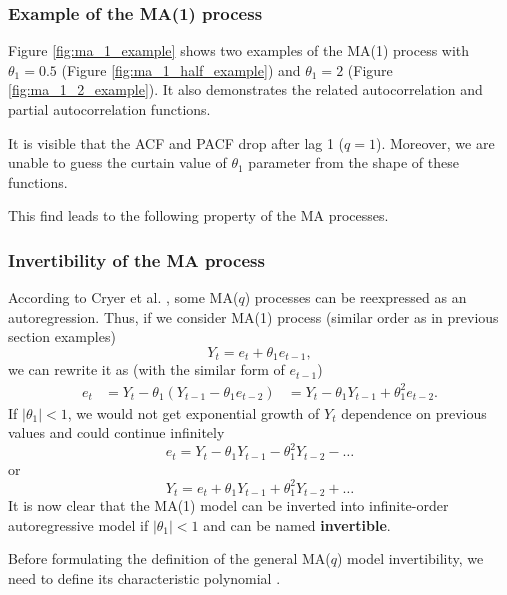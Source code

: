 \subsubsection{Example of the MA(1) process}

Figure \ref{fig:ma_1_example} shows two examples of the MA(1) process with $\theta_1 = 0.5$ (Figure \ref{fig:ma_1_half_example}) and $\theta_1 = 2$ (Figure \ref{fig:ma_1_2_example}). It also demonstrates the related autocorrelation and partial autocorrelation functions. 

It is visible that the ACF and PACF drop after lag 1 ($q = 1$). Moreover, we are unable to guess the curtain value of $\theta_1$ parameter from the shape of these functions.

This find leads to the following property of the MA processes.

\subsubsection{Invertibility of the MA process}

According to Cryer et al. \cite{cryer2008time}, some MA($q$) processes can be reexpressed as an autoregression. Thus, if we consider MA(1) process (similar order as in previous section examples)
\begin{equation}
    Y_t = e_t + \theta_{1}e_{t-1},
\end{equation}
we can rewrite it as (with the similar form of $e_{t-1}$)
\begin{equation}
\begin{aligned}
e_t &= Y_t - \theta_{1}(Y_{t-1} - \theta_{1}e_{t-2})
&= Y_t - \theta_{1}Y_{t-1} + \theta_{1}^{2}e_{t-2}.
\end{aligned}
\end{equation}
If $|\theta_1| < 1$, we would not get exponential growth of $Y_t$ dependence on previous values and could continue infinitely
\begin{equation}
    e_t = Y_t - \theta_{1}Y_{t-1} - \theta_{1}^{2}Y_{t-2} - \ldots
\end{equation}
or 
\begin{equation}
    Y_t = e_t + \theta_{1}Y_{t-1} + \theta_{1}^{2}Y_{t-2} + \ldots
\end{equation}
It is now clear that the MA(1) model can be inverted into infinite-order autoregressive model if $|\theta_1| < 1$ and can be named \textbf{invertible}.

Before formulating the definition of the general MA($q$) model invertibility, we need to define its characteristic polynomial \cite{cryer2008time}.


